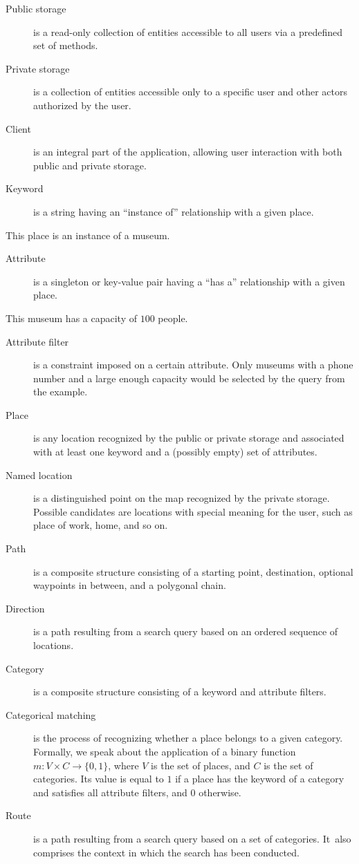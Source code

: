 \begin{description}
\item[Public storage] is a read-only collection of entities accessible to all users via a predefined set of methods.
\item[Private storage] is a collection of entities accessible only to a specific user and other actors authorized by the user.
\item[Client] is an integral part of the application, allowing user interaction with both public and private storage.
\item[Keyword] is a string having an ``instance of'' relationship with a given place.
\end{description}
\begin{center}This place is an \textsf{instance of} a museum.\end{center}
\begin{description}
\item[Attribute] is a singleton or key-value pair having a ``has a'' relationship with a given place.
\end{description}
\begin{center}This museum \textsf{has a} capacity of $100$ people.\end{center}
\begin{description}
\item[Attribute filter] is a constraint imposed on a certain attribute. Only museums with a phone number and a large enough capacity would be selected by the query from the example.
\item[Place] is any location recognized by the public or private storage and associated with at least one keyword and a (possibly empty) set of attributes.
\item[Named location] is a distinguished point on the map recognized by the private storage. Possible candidates are locations with special meaning for the user, such as place of work, home, and so on.
\item[Path] is a composite structure consisting of a starting point, destination, optional waypoints in between, and a polygonal chain.
\item[Direction] is a path resulting from a search query based on an ordered sequence of locations.
\item[Category] is a composite structure consisting of a keyword and attribute filters.
\item[Categorical matching] is the process of recognizing whether a place belongs to a given category. Formally, we speak about the application of a binary function $m: V \times C \to \{ 0, 1 \}$, where $V$ is the set of places, and $C$ is the set of categories. Its value is equal to $1$ if a place has the keyword of a category and satisfies all attribute filters, and $0$ otherwise.
\item[Route] is a path resulting from a search query based on a set of categories. It~also comprises the context in which the search has been conducted.
\end{description}

